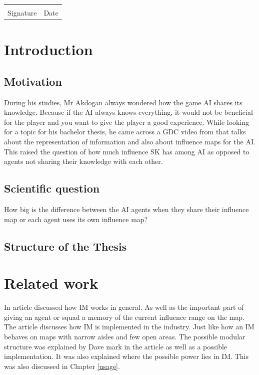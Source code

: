 \documentclass[]{report}
\begin{document}
	\vfill
	\noindent\begin{tabular}{ll}
		\makebox[2.5in]{\hrulefill} & \makebox[2.5in]{\hrulefill}\\
		Signature & Date\\[8ex]
	\end{tabular}
	\newpage
	
	\newpage
	\tableofcontents

	\chapter{Introduction}
	
	\section{Motivation}
During his studies, Mr Akdogan always wondered how the game AI shares its knowledge. Because if the \ac{AI} always knows everything, it would not be beneficial for the player and you want to give the player a good experience. While looking for a topic for his bachelor thesis, he came across a \ac{GDC} video from \citep{knowledgeReprentation} that talks about the representation of information and also about influence maps for the \ac{AI}. This raised the question of how much influence \ac{SK} has among \ac{AI} as opposed to agents not sharing their knowledge with each other.
	
	\section{Scientific question}
	How big is the difference between the \ac{AI} agents when they share their influence map or each agent uses its own influence map? 
	\section{Structure of the Thesis}
	
	\chapter{Related work}
	In \cite{10.5555/2821138} article discussed how \ac{IM} works in general. As well as the important part of giving an agent or squad a memory of the current influence range on the map.\newline
	The article \citep{gameDevInfluenceMap} discusses how \ac{IM} is implemented in the industry. Just like how an \ac{IM} behaves on maps with narrow aisles and few open areas. \newline
	The possible modular structure was explained by Dave mark in the article \citep{gameAIPro} as well as a possible implementation. It was also explained where the possible power lies in \ac{IM}. This was also discussed in Chapter \ref{usage}. 
	
\end{document}
